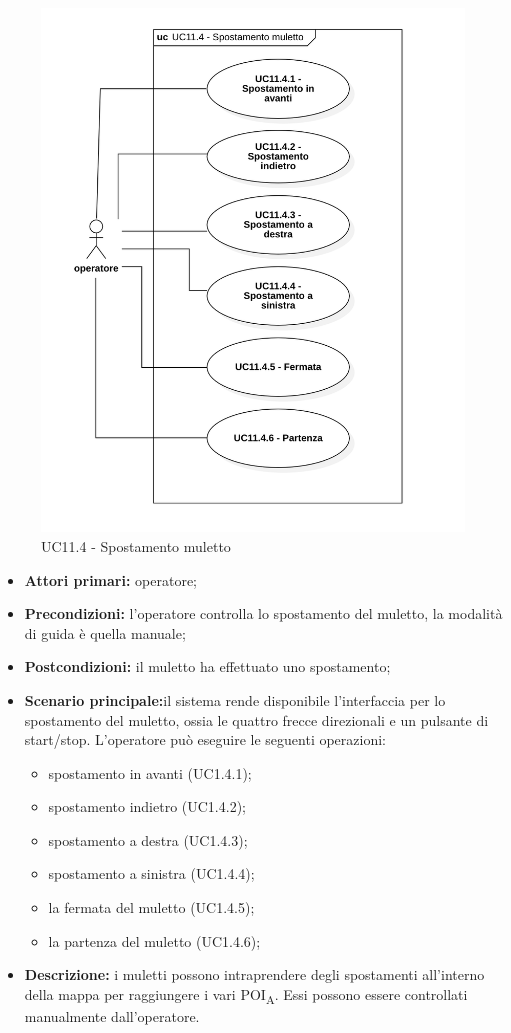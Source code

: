 \begin{figure}[H]
	\centering
	\includegraphics[scale=0.52]{res/images/uc11-4.png}
	\caption{UC11.4 - Spostamento muletto}
\end{figure}

\begin{itemize}
	\item 	\textbf{Attori primari:} operatore;
	\item 	\textbf{Precondizioni:} l'operatore controlla lo spostamento del muletto, la modalità di guida è quella manuale;
	\item 	\textbf{Postcondizioni:} il muletto ha effettuato uno spostamento;
	\item 	\textbf{Scenario principale:}il sistema rende disponibile l'interfaccia per lo spostamento del muletto, ossia le quattro frecce direzionali e un pulsante di start/stop. L'operatore può eseguire le seguenti operazioni:
	\begin{itemize}
		\item spostamento in avanti (UC1.4.1); 
		\item spostamento indietro (UC1.4.2);
		\item spostamento a destra (UC1.4.3);
		\item spostamento a sinistra (UC1.4.4);
		\item la fermata del muletto (UC1.4.5);
		\item la partenza del muletto (UC1.4.6);
	\end{itemize}
	\item 	\textbf{Descrizione:} i muletti possono intraprendere degli spostamenti all'interno della mappa per raggiungere i vari POI\textsubscript{A}. Essi possono essere controllati manualmente dall'operatore.
\end{itemize}


